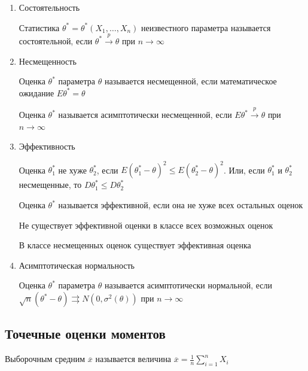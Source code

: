 \documentclass[12pt]{article}
\begin{document}
\begin{enumerate}
    \item Состоятельность

    \Defs Статистика $\theta^* = \theta^*(X_1, \dots, X_n)$ неизвестного параметра называется
    состоятельной, если $\theta^* \overset{p}{\longrightarrow} \theta$ при $n \to \infty$

    \mediumvspace

    \item Несмещенность

    \Defs Оценка $\theta^*$ параметра $\theta$ называется несмещенной, если 
    математическое ожидание $E \theta^* = \theta$
    
    \Notas Оценка $\theta^*$ называется асимптотически несмещенной, если 
    $E \theta^* \overset{p}{\longrightarrow} \theta$ при $n \to \infty$

    \mediumvspace

    \item Эффективность 

    \Defs Оценка $\theta^*_1$ не хуже $\theta^*_2$, если $E (\theta^*_1 - \theta)^2 \leq E (\theta^*_2 - \theta)^2$.
    Или, если $\theta^*_1$ и $\theta^*_2$ несмещенные, то $D \theta^*_1 \leq D \theta^*_2$

    \Defs Оценка $\theta^*$ называется эффективной, если она не хуже всех остальных оценок

    \Notas Не существует эффективной оценки в классе всех возможных оценок

    \begin{MyTheorem}
        \Ths В классе несмещенных оценок существует эффективная оценка
    \end{MyTheorem}

    \mediumvspace

    \item Асимптотическая нормальность

    \Defs Оценка $\theta^*$ параметра $\theta$ называется асимптотически нормальной, если 
    $\sqrt{n} (\theta^* - \theta) \rightrightarrows N(0, \sigma^2 (\theta))$ при $n \to \infty$
    
\end{enumerate}

\subsection{Точечные оценки моментов}

\Def Выборочным средним $\overline{x}$ называется величина $\overline{x} = \frac{1}{n} \sum_{i = 1}^n X_i$
\end{document}
